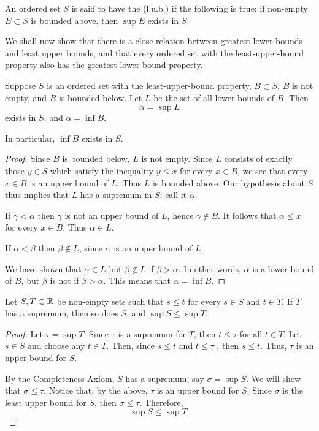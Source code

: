 \begin{definition}
An ordered set $S$ is said to have the  (l.u.b.) if the following is true: if non-empty $E\subset S$ is bounded above, then $\sup E$ exists in $S$.
\end{definition}

We shall now show that there is a close relation between greatest lower bounds and least upper bounds, and that every ordered set with the least-upper-bound property also has the greatest-lower-bound property.

\begin{theorem}
Suppose $S$ is an ordered set with the least-upper-bound property, $B\subset S$, $B$ is not empty, and $B$ is bounded below. Let $L$ be the set of all lower bounds of $B$. Then
\[ \alpha=\sup L \]
exists in $S$, and $\alpha=\inf B$.

In particular, $\inf B$ exists in $S$.
\end{theorem}

\begin{proof}
Since $B$ is bounded below, $L$ is not empty. Since $L$ consists of exactly those $y\in S$ which satisfy the inequality $y\le x$ for every $x\in B$, we see that every $x\in B$ is an upper bound of $L$. Thus $L$ is bounded above. Our hypothesis about $S$ thus implies that $L$ has a supremum in $S$; call it $\alpha$.

If $\gamma<\alpha$ then $\gamma$ is not an upper bound of $L$, hence $\gamma\notin B$. It follows that $\alpha\le x$ for every $x\in B$. Thus $\alpha\in L$.

If $\alpha<\beta$ then $\beta\notin L$, since $\alpha$ is an upper bound of $L$.

We have shown that $\alpha\in L$ but $\beta\notin L$ if $\beta>\alpha$. In other words, $\alpha$ is a lower bound of $B$, but $\beta$ is not if $\beta>\alpha$. This means that $\alpha=\inf B$.
\end{proof}




\begin{theorem}
Let $S, T \subset \mathbb R$ be non-empty sets such that $s \le t$ for every $s \in S$ and $t \in T$. If $T$ has a supremum, then so does $S$, and $\sup S \le \sup T$.
\end{theorem}

\begin{proof}
Let $\tau = \sup T$. Since $\tau$ is a supremum for $T$, then $t \le \tau$ for all $t \in T$. Let $s \in S$ and choose any $t \in T$. Then, since $s \le t$ and $t \le \tau$ , then $s \le t$. Thus, $\tau$ is an upper bound for $S$. 

By the Completeness Axiom, $S$ has a supremum, say $\sigma = \sup S$. We will show that $\sigma \le \tau$. Notice that, by the above, $\tau$ is an upper bound for $S$. Since $\sigma$ is the least upper bound for $S$, then $\sigma \le \tau$. Therefore,
\[\sup S \le \sup T.\]
\end{proof}

